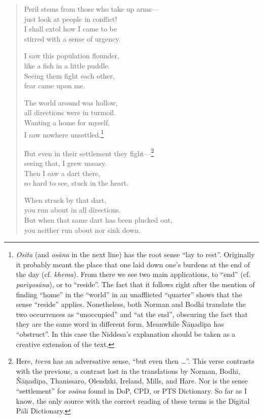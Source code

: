 \documentclass[12pt,openany]{book}%
\begin{document}
\begin{verse}%
Peril stems from those who take up arms—\\
just look at people in conflict! \\
I shall extol how I came to be \\
stirred with a sense of urgency. 

I saw this population flounder, \\
like a fish in a little puddle. \\
Seeing them fight each other, \\
fear came upon me. 

The world around was hollow, \\
all directions were in turmoil. \\
Wanting a home for myself, \\
I saw nowhere unsettled.\footnote{\textit{Osita} (and \textit{\textsanskrit{osāna}} in the next line) has the root sense “lay to rest”. Originally it probably meant the place that one laid down one’s burdens at the end of the day (cf. \textit{khema}). From there we see two main applications, to “end” (cf. \textit{\textsanskrit{pariyosāna}}), or to “reside”. The fact that it follows right after the mention of finding “home” in the “world” in an unafflicted “quarter” shows that the sense “reside” applies. Nonetheless, both Norman and Bodhi translate the two occurrences as “unoccupied” and “at the end”, obscuring the fact that they are the same word in different form. Meanwhile \textsanskrit{Ñāṇadīpa} has “obstruct”. In this case the Niddesa’s explanation should be taken as a creative extension of the text. } 

But even in their settlement they fight—\footnote{Here, \textit{tveva} has an adversative sense, “but even then …”. This verse contrasts with the previous, a contrast lost in the translations by Norman, Bodhi, \textsanskrit{Ñāṇadīpa}, Thanissaro, Olendzki, Ireland, Mills, and Hare. Nor is the sense “settlement” for \textit{\textsanskrit{osāna}} found in DoP, CPD, or PTS Dictionary. So far as I know, the only source with the correct reading of these terms is the Digital \textsanskrit{Pāli} Dictionary. } \\
seeing that, I grew uneasy. \\
Then I saw a dart there, \\
so hard to see, stuck in the heart. 

When struck by that dart, \\
you run about in all directions. \\
But when that same dart has been plucked out, \\
you neither run about nor sink down. 


\end{verse}
\end{document}
